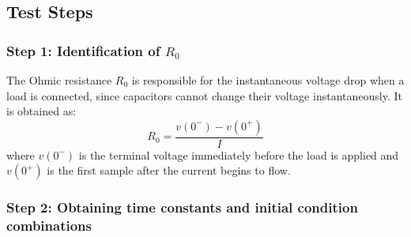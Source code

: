 \subsection{Test Steps}\label{Teststeps}

\subsubsection{Step 1: Identification of $R_0$}

The Ohmic resistance $R_0$ is responsible for the instantaneous voltage drop when a load is connected, 
since capacitors cannot change their voltage instantaneously. It is obtained as:
\begin{equation}
    R_0 = \frac{v(0^-) - v(0^+)}{I}
    \label{eq:R0}
\end{equation}
where $v(0^-)$ is the terminal voltage immediately before the load is applied and $v(0^+)$ 
is the first sample after the current begins to flow.

\subsubsection{Step 2: Obtaining time constants and initial condition combinations}

